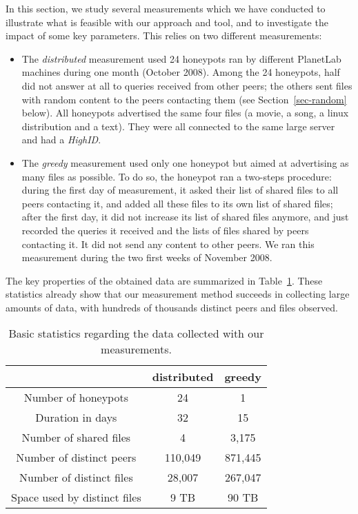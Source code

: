 \documentclass[final,
notitlepage,
narroweqnarray,
	inline,
	twoside,
]{ieee}
\begin{document}
In this section, we study several measurements which we have conducted to illustrate what is feasible with our approach and tool, and to investigate the impact of some key parameters. This relies on two different measurements:
\begin{itemize}
\item
The {\em distributed} measurement used 24 honeypots ran by different PlanetLab~\cite{plant} machines during one month (October 2008). Among the 24 honeypots, half did not answer at all to queries received from other peers; the others sent files with random content to the peers contacting them (see Section~\ref{sec-random} below). All honeypots advertised the same four files (a movie, a song, a linux distribution and a text). They were all connected to the same large server and had a {\em HighID}.
\item
The {\em greedy} measurement used only one honeypot but aimed at advertising as many files as possible. To do so, the honeypot ran a two-steps procedure: during the first day of measurement, it asked their list of shared files to all peers contacting it, and added all these files to its own list of shared files; after the first day, it did not increase its list of shared files anymore, and just recorded the queries it received and the lists of files shared by peers contacting it. It did not send any content to other peers. We ran this measurement during the two first weeks of November 2008.
\end{itemize}
The key properties of the obtained data are summarized in Table~\ref{tab-basic}. These statistics already show that our measurement method succeeds in collecting large amounts of data, with hundreds of thousands distinct peers and files observed.

\begin{table}[h!]
\centering
\begin{tabular}{|c|c|c|}
\cline{2-3}
\multicolumn{1}{c|}{} & {\bf distributed} & {\bf greedy}\\
\hline
Number of honeypots & 24 & 1\\
\hline
Duration in days & 32 & 15\\
\hline
Number of shared files & 4 & 3,175\\
\hline
Number of distinct peers & 110,049 & 871,445\\
\hline
Number of distinct files & 28,007 & 267,047\\
\hline
Space used by distinct files & 9 TB & 90 TB\\
\hline
\end{tabular}
\caption{Basic statistics regarding the data collected with our measurements.}
\label{tab-basic}
\end{table}
\end{document}
